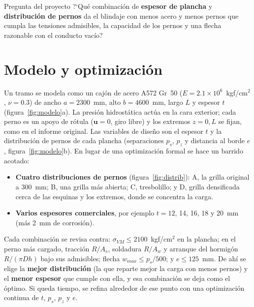\documentclass[11pt]{article}
\begin{document}
\begin{desarrollo}{Pregunta del proyecto}
?`Qu\'e combinaci\'on de \textbf{espesor de plancha} y \textbf{distribuci\'on de pernos} da el blindaje
con menos acero y menos pernos que cumpla las tensiones admisibles, la capacidad de los pernos y una
flecha razonable con el conducto vac\'io?
\end{desarrollo}

\section{Modelo y optimizaci\'on}

Un tramo se modela como un caj\'on de acero A572 Gr~50 ($E = 2.1\times10^6$~kgf/cm$^2$, $\nu=0.3$) de
ancho $a = 2300$~mm, alto $b = 4600$~mm, largo $L$ y espesor $t$ (figura~\ref{fig:modelo}a). La
presi\'on hidrost\'atica act\'ua en la cara exterior; cada perno es un apoyo de r\'otula
($\mathbf u = 0$, giro libre) y los extremos $z = 0, L$ se fijan, como en el informe original.
Las variables de dise\~no son el espesor $t$ y la distribuci\'on de pernos de cada plancha
(separaciones $p_s$, $p_z$ y distancia al borde $e$, figura~\ref{fig:modelo}b). En lugar de una
optimizaci\'on formal se hace un barrido acotado:
\begin{itemize}
  \item \textbf{Cuatro distribuciones de pernos} (figura~\ref{fig:distrib}): A, la grilla original a
        300~mm; B, una grilla m\'as abierta; C, tresbolillo; y D, grilla densificada cerca de las
        esquinas y los extremos, donde se concentra la carga.
  \item \textbf{Varios espesores comerciales}, por ejemplo $t = 12$, 14, 16, 18 y 20~mm (m\'as 2~mm de
        corrosi\'on).
\end{itemize}
Cada combinaci\'on se revisa contra: $\sigma_{VM} \le 2100$~kgf/cm$^2$ en la plancha; en el perno
m\'as cargado, tracci\'on $R/A_s$, soldadura $R/A_w$ y arranque del hormig\'on $R/(\pi D h)$ bajo sus
admisibles; flecha $w_{max} \le p_s/500$; y $e \le 125$~mm. De ah\'i se elige la \textbf{mejor
distribuci\'on} (la que reparte mejor la carga con menos pernos) y el \textbf{menor espesor} que cumple
con ella, y esa combinaci\'on se deja como el \'optimo. Si queda tiempo, se refina alrededor de ese
punto con una optimizaci\'on continua de $t$, $p_s$, $p_z$ y $e$.
\end{document}
